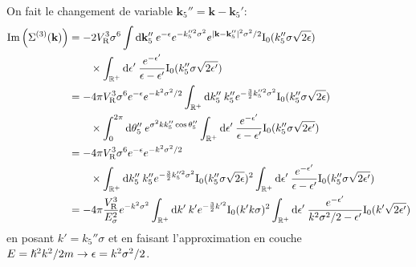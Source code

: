 On fait le changement de variable $\mathbf{k}_{\mathrm{5}}''=\mathbf{k}-\mathbf{k}_{\mathrm{5}}'$:
\begin{align}
\mathrm{Im}\left( \Sigma^{(3)}(\mathbf{k})\right)&= -2V_{\mathrm{R}}^3\sigma^6 \int{\mathop{}\mathopen{}\mathrm{d}\mathbf{k}_{\mathrm{5}}'' \: e^{-\epsilon} e^{-k_{\mathrm{5}}''^2\sigma^2} e^{|\mathbf{k}-\mathbf{k}_{\mathrm{5}}''|^2\sigma^2/2} \mathrm{I_0}(k_{\mathrm{5}}''\sigma \sqrt{2\epsilon})} \\
&\nonumber\qquad \times \int_{\mathbb{R}^+}{\mathop{}\mathopen{}\mathrm{d}\epsilon' \: \frac{e^{-\epsilon'}}{\epsilon-\epsilon'} \mathrm{I_0}(k_{\mathrm{5}}'' \sigma \sqrt{2\epsilon'})} \\
&=-4 \pi V_{\mathrm{R}}^3\sigma^6 e^{-\epsilon} e^{-k^2\sigma^2/2} \int_{\mathbb{R}^+}{\mathop{}\mathopen{}\mathrm{d} k_{\mathrm{5}}'' \: k_{\mathrm{5}}'' e^{-\frac{3}{2}k_{\mathrm{5}}''^2 \sigma^2} \mathrm{I_0}(k_{\mathrm{5}}'' \sigma \sqrt{2\epsilon})} \\
&\nonumber \qquad \times \int_0^{2\pi}{\mathop{}\mathopen{}\mathrm{d}\theta_{\mathrm{5}}'' \: e^{\sigma^2 k k_{\mathrm{5}}'' \cos\theta_{\mathrm{5}}''} \int_{\mathbb{R}^+}{\mathop{}\mathopen{}\mathrm{d} \epsilon' \: \frac{e^{-\epsilon'}}{\epsilon-\epsilon'} \mathrm{I_0}(k_{\mathrm{5}}'' \sigma \sqrt{2\epsilon'})}} \\
&=-4 \pi V_{\mathrm{R}}^3\sigma^6 e^{-\epsilon} e^{-k^2\sigma^2/2} \\
&\nonumber \qquad \times\int_{\mathbb{R}^+}{\mathop{}\mathopen{}\mathrm{d} k_{\mathrm{5}}'' \: k_{\mathrm{5}}'' e^{-\frac{3}{2}k_{\mathrm{5}}''^2 \sigma^2} \mathrm{I_0}(k_{\mathrm{5}}'' \sigma \sqrt{2\epsilon})^2 \int_{\mathbb{R}^+}{\mathop{}\mathopen{}\mathrm{d} \epsilon' \: \frac{e^{-\epsilon'}}{\epsilon-\epsilon'} \mathrm{I_0}(k_{\mathrm{5}}'' \sigma \sqrt{2\epsilon'})}} \\
&= -4 \pi \frac{V_{\mathrm{R}}^3}{E_{\sigma}^2} e^{-k^2\sigma^2} \int_{\mathbb{R}^+}{\mathop{}\mathopen{}\mathrm{d} k' \: k' e^{-\frac{3}{2}k'^2} \mathrm{I_0}(k' k \sigma)^2 \int_{\mathbb{R}^+}{\mathop{}\mathopen{}\mathrm{d} \epsilon' \: \frac{e^{-\epsilon'}}{k^2\sigma^2/2-\epsilon'} \mathrm{I_0}(k' \sqrt{2\epsilon'})}}
\end{align}
en posant $k'=k_{\mathrm{5}}''\sigma$ et en faisant l'approximation en couche $E=\hslash^2k^2/2m \rightarrow \epsilon=k^2\sigma^2/2$.